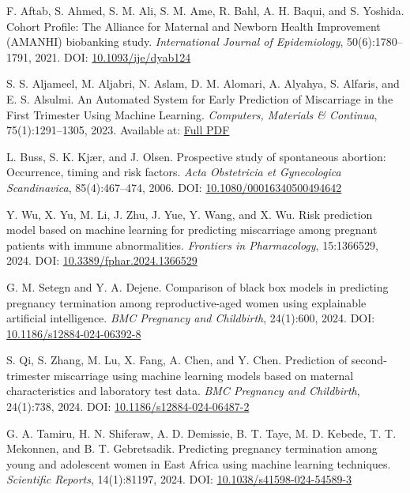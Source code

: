\documentclass{article}
\begin{document}

\begin{thebibliography}{99}

F. Aftab, S. Ahmed, S. M. Ali, S. M. Ame, R. Bahl, A. H. Baqui, and S. Yoshida.  
Cohort Profile: The Alliance for Maternal and Newborn Health Improvement (AMANHI) biobanking study.  
\textit{International Journal of Epidemiology}, 50(6):1780--1791, 2021.  
DOI: \href{https://doi.org/10.1093/ije/dyab124}{10.1093/ije/dyab124}

S. S. Aljameel, M. Aljabri, N. Aslam, D. M. Alomari, A. Alyahya, S. Alfaris, and E. S. Alsulmi.  
An Automated System for Early Prediction of Miscarriage in the First Trimester Using Machine Learning.  
\textit{Computers, Materials \& Continua}, 75(1):1291--1305, 2023.  
Available at: \href{https://cdn.techscience.cn/files/cmc/2023/TSP_CMC-75-1/TSP_CMC_35710/TSP_CMC_35710.pdf}{Full PDF}

L. Buss, S. K. Kj{\ae}r, and J. Olsen.  
Prospective study of spontaneous abortion: Occurrence, timing and risk factors.  
\textit{Acta Obstetricia et Gynecologica Scandinavica}, 85(4):467--474, 2006.  
DOI: \href{https://doi.org/10.1080/00016340500494642}{10.1080/00016340500494642}

Y. Wu, X. Yu, M. Li, J. Zhu, J. Yue, Y. Wang, and X. Wu.  
Risk prediction model based on machine learning for predicting miscarriage among pregnant patients with immune abnormalities.  
\textit{Frontiers in Pharmacology}, 15:1366529, 2024.  
DOI: \href{https://doi.org/10.3389/fphar.2024.1366529}{10.3389/fphar.2024.1366529}

G. M. Setegn and Y. A. Dejene.  
Comparison of black box models in predicting pregnancy termination among reproductive-aged women using explainable artificial intelligence.  
\textit{BMC Pregnancy and Childbirth}, 24(1):600, 2024.  
DOI: \href{https://doi.org/10.1186/s12884-024-06392-8}{10.1186/s12884-024-06392-8}

S. Qi, S. Zhang, M. Lu, X. Fang, A. Chen, and Y. Chen.  
Prediction of second-trimester miscarriage using machine learning models based on maternal characteristics and laboratory test data.  
\textit{BMC Pregnancy and Childbirth}, 24(1):738, 2024.  
DOI: \href{https://doi.org/10.1186/s12884-024-06487-2}{10.1186/s12884-024-06487-2}

G. A. Tamiru, H. N. Shiferaw, A. D. Demissie, B. T. Taye, M. D. Kebede, T. T. Mekonnen, and B. T. Gebretsadik.  
Predicting pregnancy termination among young and adolescent women in East Africa using machine learning techniques.  
\textit{Scientific Reports}, 14(1):81197, 2024.  
DOI: \href{https://doi.org/10.1038/s41598-024-54589-3}{10.1038/s41598-024-54589-3}

\end{thebibliography}
\end{document}
